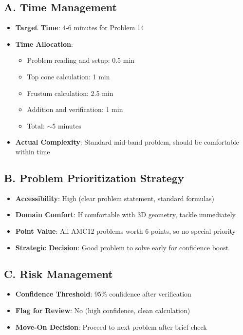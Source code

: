 \documentclass[]{article}
\begin{document}
\begin{competitionbox}
\subsection*{A. Time Management}
\begin{itemize}[leftmargin=*]
    \item \textbf{Target Time}: 4-6 minutes for Problem 14
    \item \textbf{Time Allocation}:
    \begin{itemize}
        \item Problem reading and setup: 0.5 min
        \item Top cone calculation: 1 min
        \item Frustum calculation: 2.5 min
        \item Addition and verification: 1 min
        \item Total: $\sim$5 minutes
    \end{itemize}
    \item \textbf{Actual Complexity}: Standard mid-band problem, should be comfortable within time
\end{itemize}

\subsection*{B. Problem Prioritization Strategy}
\begin{itemize}[leftmargin=*]
    \item \textbf{Accessibility}: High (clear problem statement, standard formulas)
    \item \textbf{Domain Comfort}: If comfortable with 3D geometry, tackle immediately
    \item \textbf{Point Value}: All AMC12 problems worth 6 points, so no special priority
    \item \textbf{Strategic Decision}: Good problem to solve early for confidence boost
\end{itemize}

\subsection*{C. Risk Management}
\begin{itemize}[leftmargin=*]
    \item \textbf{Confidence Threshold}: 95\% confidence after verification
    \item \textbf{Flag for Review}: No (high confidence, clean calculation)
    \item \textbf{Move-On Decision}: Proceed to next problem after brief check
\end{itemize}


\end{competitionbox}
\end{document}
